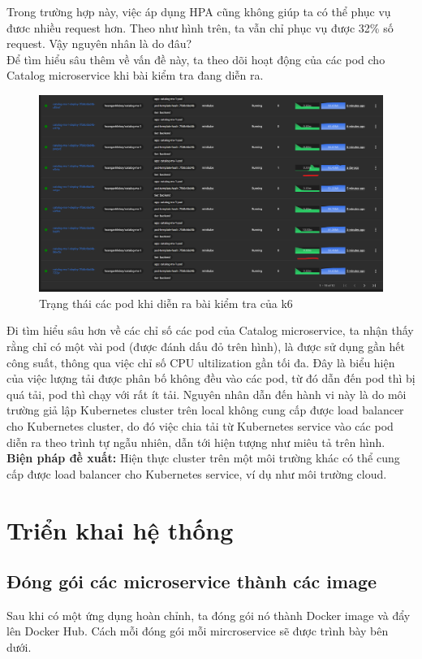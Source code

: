 Trong trường hợp này, việc áp dụng HPA cũng không giúp ta có thể phục vụ đươc nhiều request hơn. Theo như hình trên, ta vẫn chỉ phục vụ được 32\% số request. Vậy nguyên nhân là do đâu?\\[0.5cm]
Để tìm hiểu sâu thêm về vấn đề này, ta theo dõi hoạt động của các pod cho Catalog microservice khi bài kiểm tra đang diễn ra.
\begin{figure}[H]
  \begin{center}
    \includegraphics[scale=0.44]{images/hanh/test-with-hpa-pod-resource-ultilization.png}
    \caption{Trạng thái các pod khi diễn ra bài kiểm tra của k6}
  \end{center}
  \label{}
\end{figure}
Đi tìm hiểu sâu hơn về các chỉ số các pod của Catalog microservice, ta nhận thấy rằng chỉ có một vài pod (được đánh dấu đỏ trên hình), là được sử dụng gần hết công suất, thông qua việc chỉ số CPU ultilization gần tối đa. Đây là biểu hiện của việc lượng tải được phân bố không đều vào các pod, từ đó dẫn đến pod thì bị quá tải, pod thì chạy với rất ít tải. Nguyên nhân dẫn đến hành vi này là do môi trường giả lập Kubernetes cluster trên local không cung cấp được load balancer cho Kubernetes cluster, do đó việc chia tải từ Kubernetes service vào các pod diễn ra theo trình tự ngẫu nhiên, dẫn tới hiện tượng như miêu tả trên hình.\\[0.5cm]
\textbf{Biện pháp đề xuất:} Hiện thực cluster trên một môi trường khác có thể cung cấp được load balancer cho Kubernetes service, ví dụ như môi trường cloud.

\section{Triển khai hệ thống}
\subsection{Đóng gói các microservice thành các image}
\noindent Sau khi có một ứng dụng hoàn chỉnh, ta đóng gói nó thành Docker image và đẩy lên Docker Hub. Cách mỗi đóng gói mỗi mircroservice sẽ được trình bày bên dưới.\\[0.5cm]


